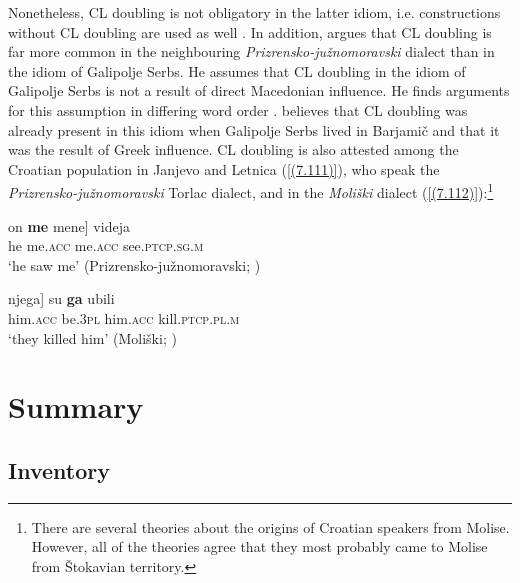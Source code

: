 \noindent Nonetheless, CL doubling is not obligatory in the latter idiom, i.e. constructions without CL doubling are used as well \citep[357]{Ivic57}. In addition, \citet[357]{Ivic57} argues that CL doubling is far more common in the neighbouring \textit{Prizrensko-južnomoravski} dialect than in the idiom of Galipolje Serbs. He assumes that CL doubling in the idiom of Galipolje Serbs is not a result of direct Macedonian influence. He finds arguments for this assumption in differing word order \citep[cf.][357]{Ivic57}. \citet[357]{Ivic57} believes that CL doubling was already present in this idiom when Galipolje Serbs lived in Barjamič and that it was the result of Greek influence.   
CL doubling is also attested among the Croatian population in Janjevo and Letnica (\ref{(7.111)}), who speak the \textit{Prizrensko-južnomoravski} Torlac dialect, and in the \textit{Moliški} dialect (\ref{(7.112)}):\footnote{There are several theories about the origins of Croatian speakers from Molise. However, all of the theories agree that they most probably came to Molise from Štokavian territory.}

\begin{exe}\ex\label{(7.111)}
\gll on 	\textbf{me} 	\minsp{[} mene] 	videja  \\
he	me.\textsc{acc} {}	me.\textsc{acc} 	see.\textsc{ptcp.sg.m} \\
\glt ‘he saw me’
\hfill  (Prizrensko-južnomoravski; \citealt[149]{Lisac03})

\ex\label{(7.112)}
\gll \minsp{[} njega]	su	\textbf{ga}	ubili \\
 {} him.\textsc{acc} 	be.3\textsc{pl} 	him.\textsc{acc}	kill.\textsc{ptcp.pl.m} \\
\glt ‘they killed him’
\hfill  (Moliški; \citealt[59]{Lisac03})
\end{exe}

\section{Summary}
\subsection{Inventory}


